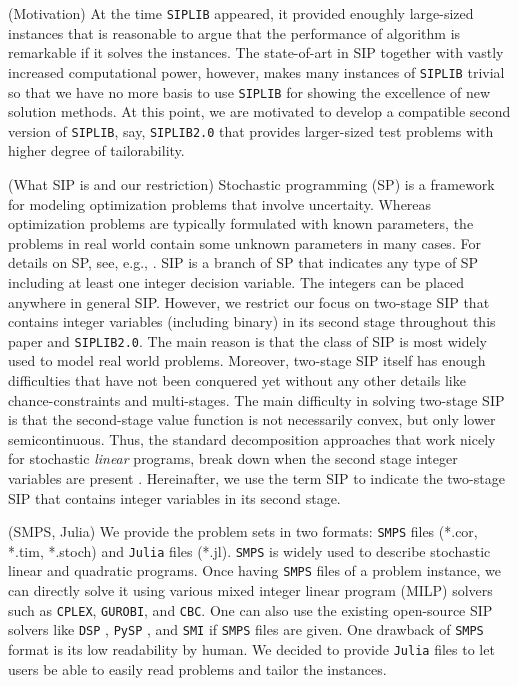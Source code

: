 (Motivation) At the time \texttt{SIPLIB} appeared, it provided enoughly large-sized instances that is reasonable to argue that the performance of algorithm is remarkable if it solves the instances. The state-of-art in SIP together with vastly increased computational power, however, makes many instances of \texttt{SIPLIB} trivial so that we have no more basis to use \texttt{SIPLIB} for showing the excellence of new solution methods. At this point, we are motivated to develop a compatible second version of \texttt{SIPLIB}, say, \texttt{SIPLIB2.0} that provides larger-sized test problems with higher degree of tailorability.

(What SIP is and our restriction) Stochastic programming (SP) is a framework for modeling optimization problems that involve uncertaity. Whereas optimization problems are typically formulated with known parameters, the problems in real world contain some unknown parameters in many cases. For details on SP, see, e.g., \cite{web:SPS,book:BL2011}. SIP is a branch of SP that indicates any type of SP including at least one integer decision variable. The integers can be placed anywhere in general SIP. However, we restrict our focus on two-stage SIP that contains integer variables (including binary) in its second stage throughout this paper and \texttt{SIPLIB2.0}. The main reason is that the class of SIP is most widely used to model real world problems. Moreover, two-stage SIP itself has enough difficulties that have not been conquered yet without any other details like chance-constraints and multi-stages. The main difficulty in solving two-stage SIP is that the second-stage value function is not necessarily convex, but only lower semicontinuous. Thus, the standard decomposition approaches that work nicely for stochastic \textit{linear} programs, break down when the second stage integer variables are present \cite{journal:AG2003}. Hereinafter, we use the term SIP to indicate the two-stage SIP that contains integer variables in its second stage.

(SMPS, Julia)
We provide the problem sets in two formats: \texttt{SMPS} files (*.cor, *.tim, *.stoch) and \texttt{Julia} files (*.jl). \texttt{SMPS} is widely used to describe stochastic linear and quadratic programs. Once having \texttt{SMPS} files of a problem instance, we can directly solve it using various mixed integer linear program (MILP) solvers such as \texttt{CPLEX}, \texttt{GUROBI}, and \texttt{CBC}. One can also use the existing open-source SIP solvers like \texttt{DSP} \cite{journal:KZ2015}, \texttt{PySP} \cite{journal:WWH2012}, and \texttt{SMI} \cite{web:SMI} if \texttt{SMPS} files are given. One drawback of \texttt{SMPS} format is its low readability by human. We decided to provide \texttt{Julia} files to let users be able to easily read problems and tailor the instances.

